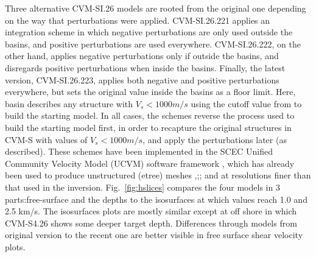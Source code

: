 Three alternative CVM-SI.26 models are rooted from the original one depending on the way that perturbations were applied. CVM-SI.26.221 applies an integration scheme in which negative perturbations are only used outside the basins, and positive perturbations are used everywhere. CVM-SI.26.222, on the other hand, applies negative perturbations only if outside the basins, and disregards positive perturbations when inside the basins. Finally, the latest version, CVM-SI.26.223, applies both negative and positive perturbations everywhere, but sets the original value inside the basins as a floor limit. Here, basin describes any structure with $V_s < 1000 m/s$ using the cutoff value from \citet{Lee_2014_JGR} to build the starting model. In all cases, the schemes reverse the process used to build the starting model first, in order to recapture the original structures in CVM-S with values of $V_s < 1000 m/s$, and apply the perturbations later (as described). These schemes have been implemented in the SCEC Unified Community Velocity Model (UCVM) software framework \citep{Gill_2015_SSA}, which has already been used to produce unstructured (etree) meshes \citet{Lee_2014_JGR},\citet{Lee_2014_JGR};\citet{Taborda_2007_Proc}; \citet{Taborda_2007_Proc} and \citet{Tu_2003_Tech} at resolutions finer than that used in the inversion. 
Fig.~\ref{fig:hslices} compares the four models in 3 parts:free-surface \vs{} and the depths to the isosurfaces at which \vs{} values reach 1.0 and 2.5 km/s. The isosurfaces plots are mostly similar except at off shore in which CVM-S4.26 shows some deeper target depth. Differences through models from original version to the recent one are better visible in free surface shear velocity plots.


